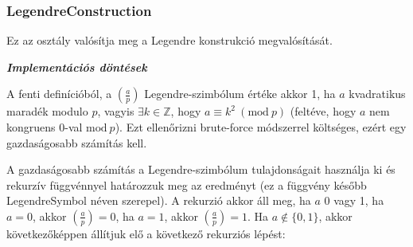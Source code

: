 \documentclass[12pt]{article}
\begin{document}
\subsubsection*{LegendreConstruction}
Ez az osztály valósítja meg a Legendre konstrukció megvalósítását.

\textbf{\textit{Implementációs döntések}}

A fenti definícióból, a $\left({\frac{a}{p}}\right)$ Legendre-szimbólum értéke akkor 1, ha $a$ kvadratikus maradék modulo $p$, vagyis $\exists k \in \mathbb{Z}$, hogy $a \equiv k^2\ (\textrm{mod}\ p)$ (feltéve, hogy $a$ nem kongruens 0-val $\textrm{mod}\ p$). Ezt ellenőrizni brute-force módszerrel költséges, ezért egy gazdaságosabb számítás kell.

A gazdaságosabb számítás a Legendre-szimbólum tulajdonságait használja ki és rekurzív függvénnyel határozzuk meg az eredményt (ez a függvény később LegendreSymbol néven szerepel). A rekurzió akkor áll meg, ha $a$ 0 vagy 1, ha $a = 0$, akkor $\left({\frac{a}{p}}\right) = 0$, ha $a=1$, akkor $\left({\frac{a}{p}}\right) = 1$. Ha $a \not\in \{0,1\}$, akkor következőképpen állítjuk elő a következő rekurziós lépést:
\end{document}
